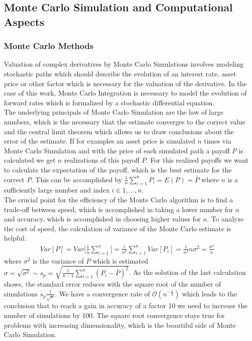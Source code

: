 \documentclass[11pt]{article}
\numberwithin{equation}{subsection}
\begin{document}
\subsection{Monte Carlo Simulation and Computational Aspects}
\subsubsection{Monte Carlo Methods}
Valuation of complex derivatives by Monte Carlo Simulations involves modeling stochastic paths which should describe the evolution of an interest rate, asset price or other factor which is necessary for the valuation of the derivative. In the case of this work, Monte Carlo Integration is necessary to model the evolution of forward rates which is formalized by a stochastic differential equation.\\
The underlying principals of Monte Carlo Simulation are the law of large numbers, which is the necessary that the estimate converges to the correct value and the central limit theorem which allows us to draw conclusions about the error of the estimate. If for examples an asset price is simulated \(n\) times via Monte Carlo Simulation and with the price of each simulated path a payoff \(P\) is calculated we get \(n\) realizations of this payoff \(P\). For this realized payoffs we want to calculate the expectation of the payoff, which is the best estimate for the correct \(P\). This can be accomplished by \(\frac{1}{n}\sum_{i=1}^{n} P_i = E(P) = \bar{P}\) where \(n\) is a sufficiently large number and index \(i \in 1,...,n\).\\
The crucial point for the efficiency of the Monte Carlo algorithm is to find a trade-off between speed, which is accomplished in taking a lower number for \(n\) and accuracy, which is accomplished in choosing higher values for \(n\). To analyze the cost of speed, the calculation of variance of the Monte Carlo estimate is helpful:
\begin{eqnarray}
	Var[P] = Var\bigg[\frac{1}{n}\sum_{i=1}^{n}\bigg] = \frac{1}{n^2}\sum_{i=1}^{n}Var[P_i] = \frac{1}{n^2} n\sigma^2 = \frac{\sigma^2}{n}
\end{eqnarray}
where \(\sigma^2\) is the variance of \(P\) which is estimated \(\sigma = \sqrt{\sigma^2} \sim s_p = \sqrt{\frac{1}{n-1}\sum_{i=1}^{n}(P_i-\bar{P})^2}\).
As the solution of the last calculation shows, the standard error reduces with the square root of the number of simulations \(s_p \frac{1}{\sqrt{n}}\). We have a convergence rate of \(\mathcal{O}(n^{-\frac{1}{2}})\) which leads to the conclusion that to reach a gain in accuracy of a factor 10 we need to increase the number of simulations by 100. The square root convergence stays true for problems with increasing dimensionality, which is the beautiful side of Monte Carlo Simulation.
\end{document}
